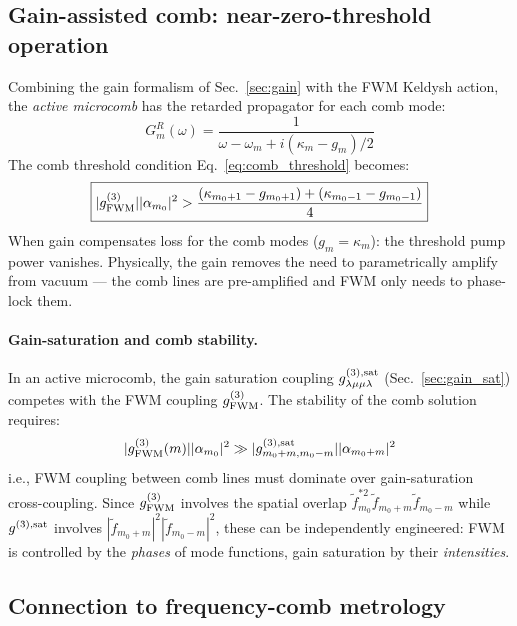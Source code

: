 \documentclass[12pt]{article}
\begin{document}
\subsection{Gain-assisted comb: near-zero-threshold operation}

Combining the gain formalism of Sec.~\ref{sec:gain} with the FWM
Keldysh action, the \emph{active microcomb} has the retarded propagator
for each comb mode:
\begin{equation}
  G^R_m(\omega) = \frac{1}{\omega - \omega_m
  + i(\kappa_m - g_m)/2}
  \label{eq:GR_active_comb}
\end{equation}
The comb threshold condition Eq.~\eqref{eq:comb_threshold} becomes:
\begin{equation}
  \boxed{
  |g^{(3)}_{\rm FWM}||\alpha_{m_0}|^2 >
  \frac{(\kappa_{m_0+1}-g_{m_0+1}) + (\kappa_{m_0-1}-g_{m_0-1})}{4}
  }
  \label{eq:active_comb_threshold}
\end{equation}
When gain compensates loss for the comb modes ($g_m = \kappa_m$):
the threshold pump power vanishes.  Physically, the gain removes the
need to parametrically amplify from vacuum --- the comb lines are
pre-amplified and FWM only needs to phase-lock them.

\paragraph{Gain-saturation and comb stability.}
In an active microcomb, the gain saturation coupling
$g^{(3),\rm sat}_{\lambda\mu\mu\lambda}$ (Sec.~\ref{sec:gain_sat})
competes with the FWM coupling $g^{(3)}_{\rm FWM}$.  The stability of
the comb solution requires:
\begin{equation}
  |g^{(3)}_{\rm FWM}(m)||\alpha_{m_0}|^2 \gg
  |g^{(3),\rm sat}_{m_0+m,m_0-m}||\alpha_{m_0+m}|^2
  \label{eq:comb_stability}
\end{equation}
i.e., FWM coupling between comb lines must dominate over gain-saturation
cross-coupling.  Since $g^{(3)}_{\rm FWM}$ involves the spatial overlap
$\tilde{f}^{*2}_{m_0}\tilde{f}_{m_0+m}\tilde{f}_{m_0-m}$ while
$g^{(3),\rm sat}$ involves $|\tilde{f}_{m_0+m}|^2|\tilde{f}_{m_0-m}|^2$,
these can be independently engineered: FWM is controlled by the
\emph{phases} of mode functions, gain saturation by their
\emph{intensities}.

\subsection{Connection to frequency-comb metrology}
\end{document}

